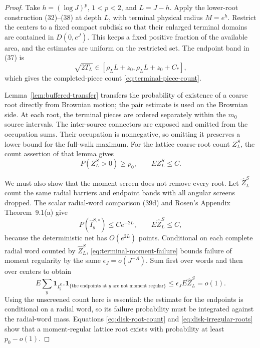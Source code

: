 \begin{proof}
Take $h=(\log J)^p$, $1<p<2$, and $L=J-h$.  Apply the lower-root
construction (32)--(38) at depth $L$, with terminal physical radius
$M=e^h$.  Restrict the centers to a fixed compact subdisk so that
their enlarged terminal domains are contained in $D(0,e^J)$.
This keeps a fixed positive fraction of the available area, and the
estimates are uniform on the restricted set.  The endpoint band in
(37) is
\[
 \sqrt{2T_L}\in[\rho_LL+z_0,\rho_LL+z_0+C_*],
\]
which gives the completed-piece count
\eqref{eq:terminal-piece-count}.

Lemma~\ref{lem:buffered-transfer} transfers the probability of
existence of a coarse root directly from Brownian motion; the pair
estimate is used on the Brownian side.  At each root, the terminal
pieces are ordered separately within the $m_0$ source intervals.
The inter-source connectors are exposed and omitted from the
occupation sums.  Their occupation is nonnegative, so omitting it
preserves a lower bound for the full-walk maximum.
For the lattice coarse-root count $Z_L^S$, the count assertion of
that lemma gives
\begin{equation}
 P(Z_L^S>0)\ge p_0,\qquad EZ_L^S\le C.
 \tag{78}\label{eq:disk-root-count}
\end{equation}

We must also show that the moment screen does not remove every
root.  Let $\widehat Z_L^S$ count the same radial barriers and
endpoint bands with all angular screens dropped.  The scalar
radial-word comparison (39d) and Rosen's Appendix Theorem~9.1(a)
give
\begin{equation}
 P(\widehat I_y^{S,\circ})\le Ce^{-2L},\qquad
 E\widehat Z_L^S\le C,
 \tag{79a}\label{eq:disk-unscreened-count}
\end{equation}
because the deterministic net has $O(e^{2L})$ points.  Conditional
on each complete radial word counted by $\widehat Z_L^S$,
\eqref{eq:terminal-moment-failure} bounds failure of moment
regularity by the same $\epsilon_J=o(J^{-A})$.  Sum first over
words and then over centers to obtain
\begin{equation}
 E\sum_y\mathbf1_{I_y^{S,\circ}}
       \mathbf1_{\{\text{the endpoints at }y\text{ are not moment regular}\}}
 \le\epsilon_J E\widehat Z_L^S=o(1).
 \tag{79}\label{eq:disk-irregular-roots}
\end{equation}
Using the unscreened count here is essential: the estimate for the
endpoints is conditional on a radial word, so its failure probability
must be integrated against the radial-word mass.  Equations
\eqref{eq:disk-root-count} and \eqref{eq:disk-irregular-roots}
show that a moment-regular lattice root exists with probability
at least $p_0-o(1)$.


\end{proof}
